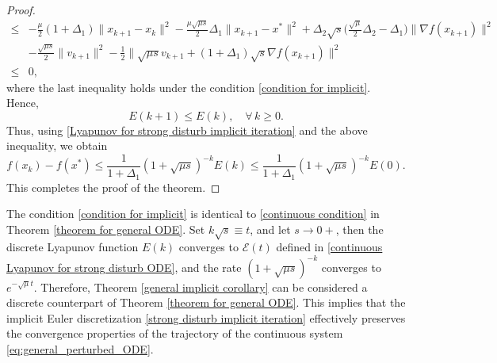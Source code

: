\documentclass[11pt]{article}
\newcommand{\1}{\mathbf 1}
\numberwithin{equation}{section}
\begin{document}
\begin{proof}
{\begin{equation*}
\begin{aligned}
            \leqslant{} & -\frac{\mu}{2}(1+\Delta_1)\|x_{k+1}-x_k\|^2-\frac{\mu\sqrt{\mu s}}{2}\Delta_1\|x_{k+1}-x^*\|^2+\Delta_2\sqrt{s}\big(\frac{\sqrt{\mu}}{2}\Delta_2-\Delta_1\big)\|\nabla f(x_{k+1})\|^2\\
            &-\frac{\sqrt{\mu s}}{2}\|v_{k+1}\|^2-\frac{1}{2}\|\sqrt{\mu s}v_{k+1}+(1+\Delta_1)\sqrt{s}\nabla f(x_{k+1})\|^2\\
            \leqslant {}&0,
        \end{aligned}
    \end{equation*}
    where the last inequality holds under the condition \eqref{condition for implicit}.
    }
    Hence, 
    \begin{equation*}
        E(k+1) \leqslant E(k),\quad \forall\, k \geqslant 0.
    \end{equation*}
    Thus, using \eqref{Lyapunov for strong disturb implicit iteration} and the above inequality, we obtain
    \begin{equation*}
        f(x_k)-f(x^*)\leqslant \frac{1}{1+\Delta_1}(1+\sqrt{\mu s})^{-k}E(k)\leqslant \frac{1}{1+\Delta_1}(1+\sqrt{\mu s})^{-k}E(0).
    \end{equation*}
    This completes the proof of the theorem.
\end{proof}

    The condition \eqref{condition for implicit} is identical to \eqref{continuous condition} in Theorem \ref{theorem for general ODE}. Set $k\sqrt{s}\equiv t$, and let $s\to 0+$, then the discrete Lyapunov function  $E(k)$ converges to $ \mathcal{E}(t)$ defined in  \eqref{continuous Lyapunov for strong disturb ODE}, and the rate $(1+\sqrt{\mu s})^{-k}$ converges to $ e^{-\sqrt{\mu}t}$. Therefore, Theorem \ref{general implicit corollary} can be considered a discrete counterpart of Theorem \ref{theorem for general ODE}. This implies that the implicit Euler discretization \eqref{strong disturb implicit iteration} effectively preserves the convergence properties of the trajectory of the continuous system \eqref{eq:general_perturbed_ODE}.
\end{document}
